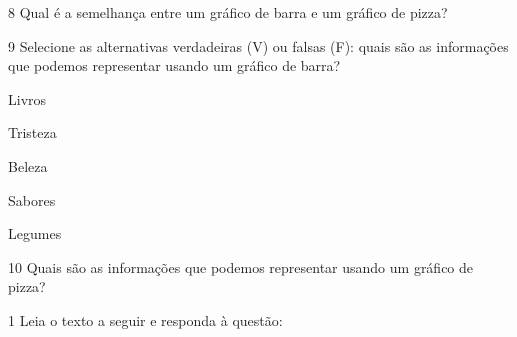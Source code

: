 \num{8} Qual é a semelhança entre um gráfico de barra e um gráfico de
pizza?



\num{9} Selecione as alternativas verdadeiras (V) ou falsas (F): quais são
as informações que podemos representar usando um gráfico de barra?

\begin{boxlist}
\item Livros 

\item Tristeza 

\item Beleza 

\item Sabores 

\item Legumes 
\end{boxlist}

\num{10} Quais são as informações que podemos representar usando um gráfico
de pizza?



\num{1} Leia o texto a seguir e responda à questão:

